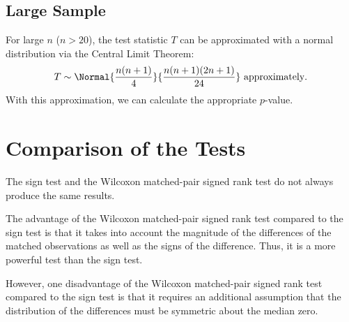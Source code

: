 \subsection{Large Sample}

For large $n$ ($n > 20$), the test statistic $T$ can be approximated with a normal distribution via the Central Limit Theorem: \[T \sim \Normal{\frac{n(n+1)}4}{\frac{n(n+1)(2n+1)}{24}} \text{ approximately}.\] With this approximation, we can calculate the appropriate $p$-value.

\section{Comparison of the Tests}

The sign test and the Wilcoxon matched-pair signed rank test do not always produce the same results.

The advantage of the Wilcoxon matched-pair signed rank test compared to the sign test is that it takes into account the magnitude of the differences of the matched observations as well as the signs of the difference. Thus, it is a more powerful test than the sign test.

However, one disadvantage of the Wilcoxon matched-pair signed rank test compared to the sign test is that it requires an additional assumption that the distribution of the differences must be symmetric about the median zero.